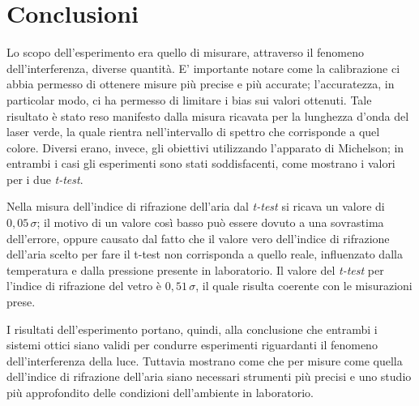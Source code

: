 \section{Conclusioni}
Lo scopo dell'esperimento era quello di misurare, attraverso il fenomeno dell'interferenza, diverse quantità.
E' importante notare come la calibrazione ci abbia permesso di ottenere misure più precise e più accurate; l'accuratezza, in particolar modo, ci ha permesso di limitare i bias sui valori ottenuti. Tale risultato è stato reso manifesto dalla misura ricavata per la lunghezza d'onda  del laser verde, la quale rientra nell'intervallo di spettro che corrisponde a quel colore. 
Diversi erano, invece, gli obiettivi utilizzando l'apparato di Michelson; in entrambi i casi gli esperimenti sono stati soddisfacenti, come mostrano i valori per i due \textit{t-test}.

Nella misura dell'indice di rifrazione dell'aria dal \textit{t-test} si ricava un valore di $0,05\, \sigma $; il motivo di un valore così basso può essere dovuto a una sovrastima dell'errore, oppure causato dal fatto che il valore vero dell'indice di rifrazione dell'aria scelto per fare il t-test non corrisponda a quello reale, influenzato dalla temperatura e dalla pressione presente in laboratorio. Il valore del \textit{t-test} per l'indice di rifrazione del vetro è $0,51\,\sigma $, il quale risulta coerente con le misurazioni prese. 

I risultati dell'esperimento portano, quindi, alla conclusione che entrambi i sistemi ottici siano validi per condurre esperimenti riguardanti il fenomeno dell'interferenza della luce. Tuttavia mostrano come che per misure come quella dell'indice di rifrazione dell'aria siano necessari strumenti più precisi e uno studio più approfondito delle condizioni dell'ambiente in laboratorio.

